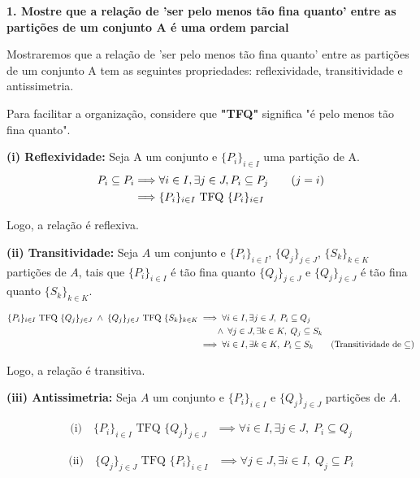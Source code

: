 \textbf{1. Mostre que a relação de 'ser pelo menos tão fina quanto' entre as partições de um conjunto A é uma ordem parcial}

Mostraremos que a relação de 'ser pelo menos tão fina quanto' entre as partições de um conjunto A tem as seguintes propriedades: reflexividade, transitividade e antissimetria.

Para facilitar a organização, considere que \textbf{"TFQ"} significa "é pelo menos tão fina quanto".

\textbf{(i) Reflexividade:}
Seja A um conjunto e $\{P_i\}_{i \in I}$ uma partição de A.
\begin{align*}
	P_i \subseteq P_i
	 & \Longrightarrow \forall i \in I, \exists j \in J, P_i \subseteq P_j \tag*{\text{($j = i$)}} \\
	 & \Longrightarrow \{P_i\}_{i \in I} \text{ TFQ } \{P_i\}_{i \in I}
\end{align*}

Logo, a relação é reflexiva.

\textbf{(ii) Transitividade:}
Seja $A$ um conjunto e $\{P_i\}_{i \in I}$, $\{Q_j\}_{j \in J}$, $\{S_k\}_{k \in K}$ partições de $A$, tais que
$\{P_i\}_{i \in I}$ é tão fina quanto $\{Q_j\}_{j \in J}$ e $\{Q_j\}_{j \in J}$ é tão fina quanto $\{S_k\}_{k \in K}$.

\begin{align*}
	\{P_i\}_{i \in I} \text{ TFQ } \{Q_j\}_{j \in J} \;\land\; \{Q_j\}_{j \in J} \text{ TFQ } \{S_k\}_{k \in K}
	 & \implies \forall i \in I, \exists j \in J,\; P_i \subseteq Q_j                                               \\
	 & \qquad\land\; \forall j \in J, \exists k \in K,\; Q_j \subseteq S_k                                          \\
	 & \implies \forall i \in I, \exists k \in K,\; P_i \subseteq S_k \tag*{\text{(Transitividade de $\subseteq$)}}
\end{align*}

Logo, a relação é transitiva.

\textbf{(iii) Antissimetria:}
Seja $A$ um conjunto e $\{P_i\}_{i \in I}$ e $\{Q_j\}_{j \in J}$ partições de $A$.

\begin{align*}
	\text{(i)}\quad
	\{P_i\}_{i \in I} \text{ TFQ } \{Q_j\}_{j \in J}
	 & \implies \forall i \in I, \exists j \in J,\; P_i \subseteq Q_j
\end{align*}

\begin{align*}
	\text{(ii)}\quad
	\{Q_j\}_{j \in J} \text{ TFQ } \{P_i\}_{i \in I}
	 & \implies \forall j \in J, \exists i \in I,\; Q_j \subseteq P_i
\end{align*}

